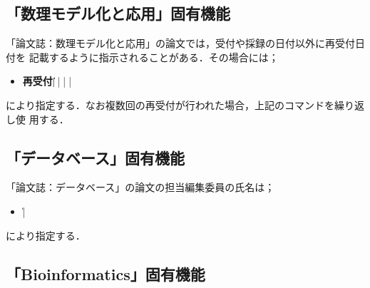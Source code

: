 
\subsection{「数理モデル化と応用」固有機能}

「論文誌：数理モデル化と応用」の論文では，受付や採録の日付以外に再受付日付を
記載するように指示されることがある．その場合には；
%
\begin{itemize}\item[]
\|\|{\bf 再受付}\|{|\<年\>\|}{|\<月\>\|}{|\<日\>\|}|
\end{itemize}
%
により指定する．なお複数回の再受付が行われた場合，上記のコマンドを繰り返し使
用する．


\subsection{「データベース」固有機能}

「論文誌：データベース」の論文の担当編集委員の氏名は；
%
\begin{itemize}\item[]
\||
\end{itemize}
%
により指定する．


\subsection{「Bioinformatics」固有機能}

